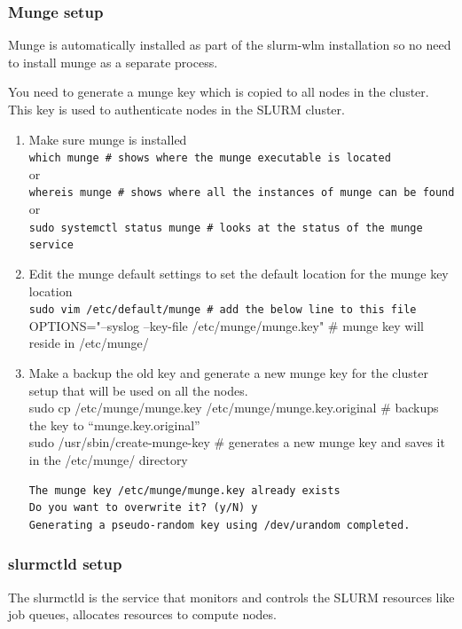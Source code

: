 {\subsubsection{Munge setup}
Munge is automatically installed as part of the slurm-wlm installation so no need to install munge as
a separate process.

You need to generate a munge key which is copied to all nodes in the cluster. This key is used to
authenticate nodes in the SLURM cluster.
\begin{enumerate}
\item Make sure munge is installed\\
\verb|which munge # shows where the munge executable is located|\\
or\\
\verb|whereis munge # shows where all the instances of munge can be found|\\
or\\
\verb|sudo systemctl status munge # looks at the status of the munge service |

\item Edit the munge default settings to set the default location for the munge key location\\
\verb|sudo vim /etc/default/munge # add the below line to this file |\\
OPTIONS="--syslog --key-file /etc/munge/munge.key" \# munge key will reside in
/etc/munge/

\item Make a backup the old key and generate a new munge key for the cluster setup that will be
used on all the nodes.\\
sudo cp /etc/munge/munge.key /etc/munge/munge.key.original \# backups the key to
“munge.key.original”\\
sudo /usr/sbin/create-munge-key \# generates a new munge key and saves it in the
/etc/munge/ directory\\
\begin{verbatim}
The munge key /etc/munge/munge.key already exists
Do you want to overwrite it? (y/N) y
Generating a pseudo-random key using /dev/urandom completed.
\end{verbatim}
\end{enumerate}

\subsubsection{slurmctld setup}
The slurmctld is the service that monitors and controls the SLURM resources like job queues,
allocates resources to compute nodes.

}
